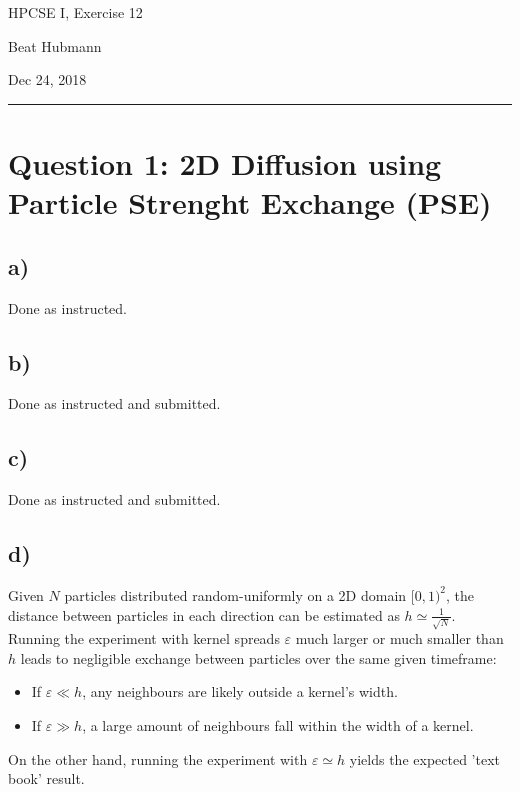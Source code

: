\documentclass[11pt,a4paper]{article}
\begin{document}
\noindent\parbox{\linewidth}{
 \parbox{.25\linewidth}{ \large HPCSE I, Exercise 12 }\hfill
 \parbox{.5\linewidth}{\begin{center} \large Beat Hubmann \end{center}}\hfill
 \parbox{.2\linewidth}{\begin{flushright} \large Dec 24, 2018 \end{flushright}}
}
\noindent\rule{\linewidth}{2pt}

\section{Question 1: 2D Diffusion using Particle Strenght Exchange (PSE)}

\subsection{a)}
Done as instructed.

\subsection{b)}
Done as instructed and submitted.

\subsection{c)}
Done as instructed and submitted.

\subsection{d)}

Given $N$ particles distributed random-uniformly on a 2D domain $[0,1)^2$, the distance between
particles in each direction can be estimated as $h \simeq \frac{1}{\sqrt{N}}$.\\

Running the experiment with kernel spreads $\varepsilon$ much larger or much smaller than $h$ leads to negligible exchange
between particles over the same given timeframe:
\begin{itemize}
    \item If $\varepsilon \ll h$, any neighbours are likely outside a kernel's width.
    \item If $\varepsilon \gg h$, a large amount of neighbours fall within the width of a kernel.
\end{itemize}

On the other hand, running the experiment with $\varepsilon \simeq h$ yields the expected 'text book' result.


\end{document}

